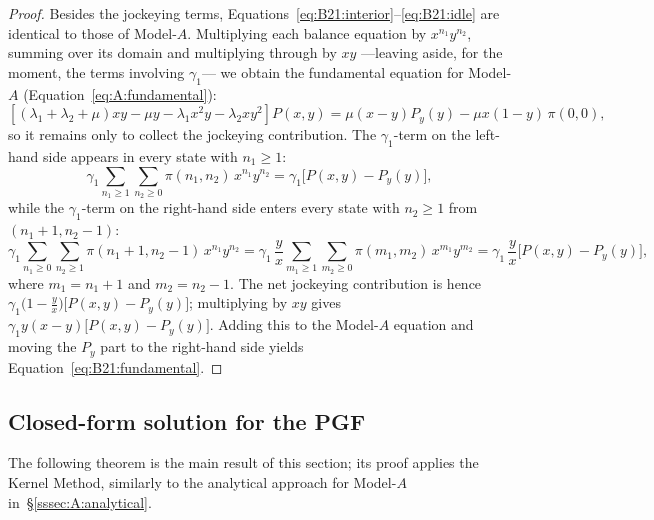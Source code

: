 \begin{proof}
Besides the jockeying terms, Equations~\eqref{eq:B21:interior}--\eqref{eq:B21:idle} are identical to those of Model-$A$. Multiplying each balance equation by $x^{n_1}y^{n_2}$, summing over its domain and multiplying through by $xy$ ---leaving aside, for the moment, the terms involving $\gamma_1$--- we obtain the fundamental equation for Model-$A$ (Equation~\eqref{eq:A:fundamental}):
\begin{equation*}
    \left[ (\lambda_1+\lambda_2+\mu)xy - \mu y - \lambda_1 x^2y - \lambda_2 xy^2 \right] P(x,y)
    = \mu(x-y) P_y(y) - \mu x(1-y)\,\pi(0,0),
\end{equation*}
so it remains only to collect the jockeying contribution. The $\gamma_1$-term on the left-hand side appears in every state with $n_1\ge1$:
\begin{equation*}
    \gamma_1\sum_{n_1\ge1}\sum_{n_2\ge0}\pi(n_1,n_2)\,x^{n_1}y^{n_2}
    = \gamma_1\bigl[P(x,y)-P_y(y)\bigr],
\end{equation*}
while the $\gamma_1$-term on the right-hand side enters every state with $n_2\ge1$ from $(n_1+1,n_2-1)$:
\begin{equation*}
    \gamma_1\sum_{n_1\ge0}\sum_{n_2\ge1}\pi(n_1+1,n_2-1)\,x^{n_1}y^{n_2}
    = \gamma_1\,\frac{y}{x}\sum_{m_1\ge1}\sum_{m_2\ge0}\pi(m_1,m_2)\,x^{m_1}y^{m_2}
    = \gamma_1\,\frac{y}{x}\bigl[P(x,y)-P_y(y)\bigr],
\end{equation*}
where $m_1=n_1+1$ and $m_2=n_2-1$. The net jockeying contribution is hence $\gamma_1\bigl(1-\tfrac{y}{x}\bigr)\bigl[P(x,y)-P_y(y)\bigr]$; multiplying by $xy$ gives $\gamma_1 y(x-y)\bigl[P(x,y)-P_y(y)\bigr]$. Adding this to the Model-$A$ equation and moving the $P_y$ part to the right-hand side yields Equation~\eqref{eq:B21:fundamental}.
\end{proof}

\subsection{Closed-form solution for the PGF}

The following theorem is the main result of this section; its proof applies the Kernel Method, similarly to the analytical approach for Model-$A$ in~\S\ref{sssec:A:analytical}.

